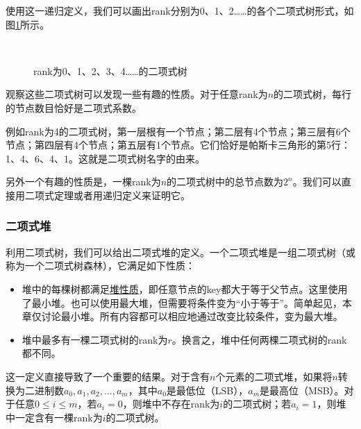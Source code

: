 \documentclass[UTF8]{article}
\begin{document}
使用这一递归定义，我们可以画出rank分别为0、1、2……的各个二项式树形式，如图\ref{fig:bitree-forms}所示。

\begin{figure}[htbp]
  \centering
   \\
  \caption{rank为0、1、2、3、4……的二项式树} \label{fig:bitree-forms}
\end{figure}

观察这些二项式树可以发现一些有趣的性质。对于任意rank为$n$的二项式树，每行的节点数目恰好是二项式系数。

例如rank为4的二项式树，第一层根有一个节点；第二层有4个节点；第三层有6个节点；第四层有4个节点；第五层有1个节点。它们恰好是帕斯卡三角形的第5行：1、4、6、4、1。这就是二项式树名字的由来。

另外一个有趣的性质是，一棵rank为$n$的二项式树中的总节点数为$2^n$。我们可以直接用二项式定理或者用递归定义来证明它。

\subsubsection{二项式堆}
\label{Binomial heap} 

利用二项式树，我们可以给出二项式堆的定义。一个二项式堆是一组二项式树（或称为一个二项式树森林），它满足如下性质：

\begin{itemize}
\item 堆中的每棵树都满足\underline{堆性质}，即任意节点的key都大于等于父节点。这里使用了最小堆。也可以使用最大堆，但需要将条件变为“小于等于”。简单起见，本章仅讨论最小堆。所有内容都可以相应地通过改变比较条件，变为最大堆。
\item 堆中最多有一棵二项式树的rank为$r$。换言之，堆中任何两棵二项式树的rank都不同。
\end{itemize}

这一定义直接导致了一个重要的结果。对于含有$n$个元素的二项式堆，如果将$n$转换为二进制数$a_0, a_1, a_2, ..., a_m$，其中$a_0$是最低位（LSB），$a_m$是最高位（MSB）。对于任意$0 \leq i \leq m$，若$a_i=0$，则堆中不存在rank为$i$的二项式树；若$a_i = 1$，则堆中一定含有一棵rank为$i$的二项式树。
\end{document}

